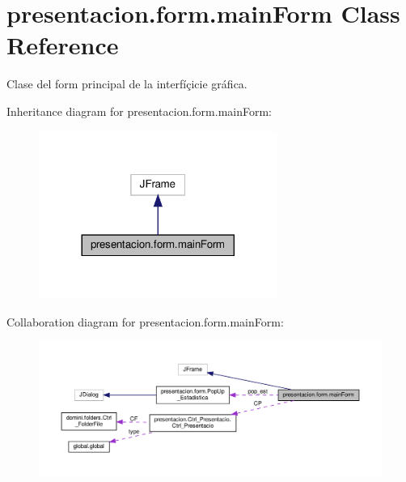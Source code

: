 \hypertarget{classpresentacion_1_1form_1_1mainForm}{}\section{presentacion.\+form.\+main\+Form Class Reference}
\label{classpresentacion_1_1form_1_1mainForm}


Clase del form principal de la interfíçicie gráfica.  




Inheritance diagram for presentacion.\+form.\+main\+Form\+:\nopagebreak
\begin{figure}[H]
\begin{center}
\leavevmode
\includegraphics[width=221pt]{classpresentacion_1_1form_1_1mainForm__inherit__graph}
\end{center}
\end{figure}


Collaboration diagram for presentacion.\+form.\+main\+Form\+:\nopagebreak
\begin{figure}[H]
\begin{center}
\leavevmode
\includegraphics[width=350pt]{classpresentacion_1_1form_1_1mainForm__coll__graph}
\end{center}
\end{figure}
